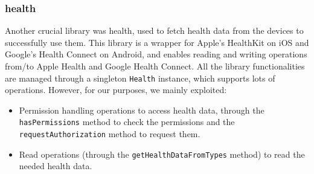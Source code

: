 

\subsubsection{health}
Another crucial library was health, used to fetch health data from the devices to successfully use them. This library is a wrapper for Apple's HealthKit on iOS and Google's Health Connect on Android, and enables reading and writing operations from/to Apple Health and Google Health Connect. All the library functionalities are managed through a singleton \texttt{Health} instance, which supports lots of operations. \newline However, for our purposes, we mainly exploited: 

\begin{itemize}[nosep] %
    \item Permission handling operations to access health data, through the \texttt{hasPermissions} method to check the permissions and the \texttt{requestAuthorization} method to request them.
    \item Read operations (through the \texttt{getHealthDataFromTypes} method) to read the needed health data.
\end{itemize}

